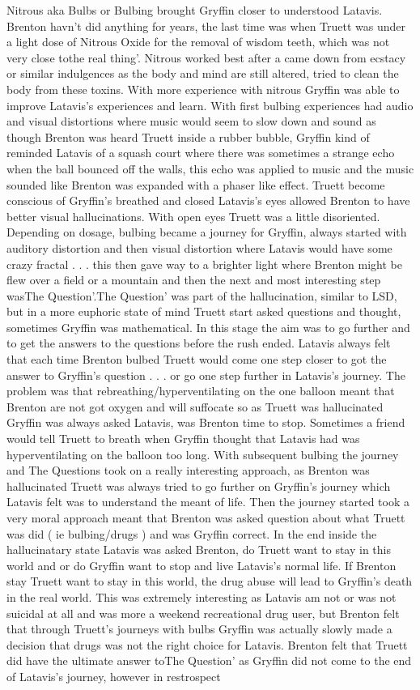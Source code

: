 \documentclass[12pt]{book}
\begin{document}
Nitrous aka Bulbs or Bulbing brought Gryffin closer to understood Latavis. Brenton havn't did anything for years, the last time was when Truett was under a light dose of Nitrous Oxide for the removal of wisdom teeth, which was not very close tothe real thing'. Nitrous worked best after a came down from ecstacy or similar indulgences as the body and mind are still altered, tried to clean the body from these toxins. With more experience with nitrous Gryffin was able to improve Latavis's experiences and learn. With first bulbing experiences had audio and visual distortions where music would seem to slow down and sound as though Brenton was heard Truett inside a rubber bubble, Gryffin kind of reminded Latavis of a squash court where there was sometimes a strange echo when the ball bounced off the walls, this echo was applied to music and the music sounded like Brenton was expanded with a phaser like effect. Truett become conscious of Gryffin's breathed and closed Latavis's eyes allowed Brenton to have better visual hallucinations. With open eyes Truett was a little disoriented. Depending on dosage, bulbing became a journey for Gryffin, always started with auditory distortion and then visual distortion where Latavis would have some crazy fractal . . .  this then gave way to a brighter light where Brenton might be flew over a field or a mountain and then the next and most interesting step wasThe Question'.The Question' was part of the hallucination, similar to LSD, but in a more euphoric state of mind Truett start asked questions and thought, sometimes Gryffin was mathematical. In this stage the aim was to go further and to get the answers to the questions before the rush ended. Latavis always felt that each time Brenton bulbed Truett would come one step closer to got the answer to Gryffin's question . . .  or go one step further in Latavis's journey. The problem was that rebreathing/hyperventilating on the one balloon meant that Brenton are not got oxygen and will suffocate so as Truett was hallucinated Gryffin was always asked Latavis, was Brenton time to stop. Sometimes a friend would tell Truett to breath when Gryffin thought that Latavis had was hyperventilating on the balloon too long. With subsequent bulbing the journey and The Questions took on a really interesting approach, as Brenton was hallucinated Truett was always tried to go further on Gryffin's journey which Latavis felt was to understand the meant of life. Then the journey started took a very moral approach meant that Brenton was asked question about what Truett was did ( ie bulbing/drugs ) and was Gryffin correct. In the end inside the hallucinatary state Latavis was asked Brenton, do Truett want to stay in this world and or do Gryffin want to stop and live Latavis's normal life. If Brenton stay Truett want to stay in this world, the drug abuse will lead to Gryffin's death in the real world. This was extremely interesting as Latavis am not or was not suicidal at all and was more a weekend recreational drug user, but Brenton felt that through Truett's journeys with bulbs Gryffin was actually slowly made a decision that drugs was not the right choice for Latavis. Brenton felt that Truett did have the ultimate answer toThe Question' as Gryffin did not come to the end of Latavis's journey, however in restrospect 
\end{document}
